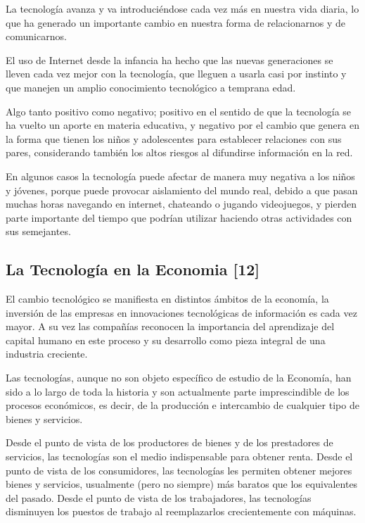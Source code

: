 \documentclass{bmcart}
\begin{document}
La tecnología avanza y va introduciéndose cada vez más en nuestra vida diaria,  lo que ha generado un importante cambio en nuestra forma de relacionarnos y de comunicarnos.\smallskip

El uso de Internet desde la infancia ha hecho que las nuevas generaciones se lleven cada vez mejor con la tecnología, que lleguen a usarla casi por instinto y que manejen un amplio conocimiento tecnológico a temprana edad.\smallskip

Algo tanto positivo como negativo; positivo en el sentido de que la tecnología se ha vuelto un aporte en materia educativa, y negativo por el cambio que genera en la forma que tienen los niños y adolescentes para establecer relaciones con sus pares, considerando también los altos riesgos al difundirse información en la red.\smallskip

En algunos casos la tecnología puede afectar de manera muy negativa a los niños y jóvenes, porque puede provocar aislamiento del mundo real, debido a que pasan muchas horas navegando en internet, chateando o jugando videojuegos, y pierden parte importante del tiempo que podrían utilizar haciendo otras actividades con sus semejantes.\smallskip

 
 \subsection*{La Tecnología en la Economia [12]}
 \smallskip
 
El cambio tecnológico se manifiesta en distintos ámbitos de la economía, la inversión de las empresas en innovaciones tecnológicas de información es cada vez mayor. A su vez las compañías reconocen la importancia del aprendizaje del capital humano en este proceso y su desarrollo como pieza integral de una industria creciente.\smallskip

Las tecnologías, aunque no son objeto específico de estudio de la Economía, han sido a lo largo de toda la historia y son actualmente parte imprescindible de los procesos económicos, es decir, de la producción e intercambio de cualquier tipo de bienes y servicios.\smallskip

Desde el punto de vista de los productores de bienes y de los prestadores de servicios, las tecnologías son el medio indispensable para obtener renta. Desde el punto de vista de los consumidores, las tecnologías les permiten obtener mejores bienes y servicios, usualmente (pero no siempre) más baratos que los equivalentes del pasado. Desde el punto de vista de los trabajadores, las tecnologías disminuyen los puestos de trabajo al reemplazarlos crecientemente con máquinas.\smallskip
\end{document}
